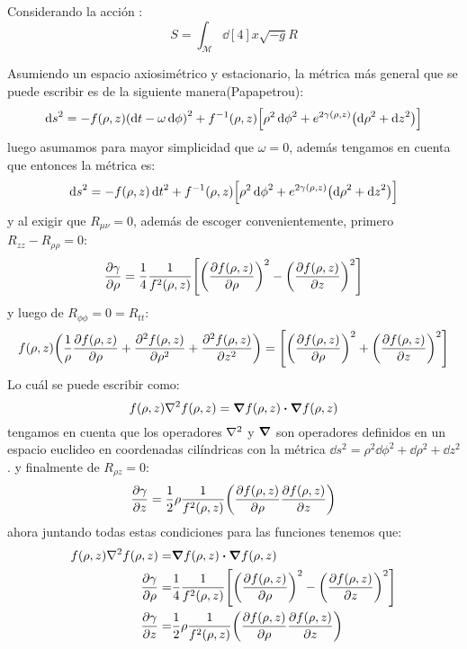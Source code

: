 \documentclass[../Main.tex]{subfiles}
\begin{document}
Considerando la acción :
\begin{equation}
    S=\int_{\mathcal{M}} \dd[4]{x}\sqrt{-g}R
\end{equation}


Asumiendo un espacio axiosimétrico y estacionario, la métrica más general que se puede escribir es de la siguiente manera(Papapetrou):
%
\begin{equation}
    \dd{s}^{2} = -f(\rho,z)\qty(\dd{t}-\omega\dd{\phi})^{2}+f^{-1}(\rho,z)\qty[\rho^{2}\dd{\phi}^{2}+e^{2\gamma(\rho,z)}\qty(\dd{\rho}^{2}+\dd{z}^{2})]
    \label{papapetrou}
\end{equation}
%
luego asumamos para mayor simplicidad que $\omega=0$, además tengamos en cuenta que  entonces la métrica es:
%
\begin{equation}
    \dd{s}^{2} = -f(\rho,z)\dd{t}^{2}+f^{-1}(\rho,z)\qty[\rho^{2}\dd{\phi}^{2}+e^{2\gamma(\rho,z)}\qty(\dd{\rho}^{2}+\dd{z}^{2})]
    \label{metric}
\end{equation}
%
y al exigir que $R_{\mu\nu}=0$, además de escoger convenientemente, primero $R_{zz}-R_{\rho\rho}=0$:
\begin{equation}
    \pdv{\gamma}{\rho}=\dfrac{1}{4}\dfrac{1}{f^{2}(\rho,z)}\qty[\qty(\pdv{f(\rho,z)}{\rho})^{2}-\qty(\pdv{f(\rho,z)}{z})^{2}]
\end{equation}
%
y luego de $R_{\phi\phi}=0=R_{tt}$:
\begin{equation}
    f(\rho,z)\qty(\dfrac{1}{\rho}\pdv{f(\rho,z)}{\rho}+\pdv[2]{f(\rho,z)}{\rho}+\pdv[2]{f(\rho,z)}{z})=\qty[\qty(\pdv{f(\rho,z)}{\rho})^{2}+\qty(\pdv{f(\rho,z)}{z})^{2}]
\end{equation}
%
Lo cuál se puede escribir como:
\begin{equation}
    f(\rho,z)\laplacian{f(\rho,z)}=\grad{f(\rho,z)}\vdot\grad{f(\rho,z)}
\end{equation}
%
tengamos en cuenta que los operadores $\laplacian$ y $\grad$ son operadores definidos en un espacio euclideo en coordenadas cilíndricas con la métrica $\dd{s}^{2} = \rho^{2}\dd{\phi}^{2}+\dd{\rho}^{2}+\dd{z}^{2}$.
%
\newline
%
y finalmente de $R_{\rho z}=0$:
\begin{equation}
    \pdv{\gamma}{z}=\dfrac{1}{2}\rho\dfrac{1}{f^{2}(\rho,z)}\qty(\pdv{f(\rho,z)}{\rho}\pdv{f(\rho,z)}{z})
\end{equation}
%
ahora juntando todas estas condiciones para las funciones tenemos que:
\begin{eqnarray}
    \label{Function_f}
    f(\rho,z)\laplacian{f(\rho,z)}= & \grad{f(\rho,z)}\vdot\grad{f(\rho,z)}\\
    \label{gamma_partial_rho}
    \pdv{\gamma}{\rho}= & \dfrac{1}{4}\dfrac{1}{f^{2}(\rho,z)}\qty[\qty(\pdv{f(\rho,z)}{\rho})^{2}-\qty(\pdv{f(\rho,z)}{z})^{2}] \\
    \label{gamma_partial_z}
    \pdv{\gamma}{z}= & \dfrac{1}{2}\rho\dfrac{1}{f^{2}(\rho,z)}\qty(\pdv{f(\rho,z)}{\rho}\pdv{f(\rho,z)}{z})
\end{eqnarray}
\end{document}
